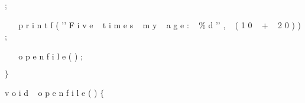 \documentclass[8, usernames, dvipsnames]{beamer}
\begin{document}
\begin{frame}
\textcolor{PineGreen}{;}

\textcolor{White}{\ }
\textcolor{White}{\ }
\textcolor{PineGreen}{p}
\textcolor{PineGreen}{r}
\textcolor{PineGreen}{i}
\textcolor{PineGreen}{n}
\textcolor{PineGreen}{t}
\textcolor{PineGreen}{f}
\textcolor{PineGreen}{(}
\textcolor{PineGreen}{'\hspace{0pt}'}
\textcolor{PineGreen}{F}
\textcolor{PineGreen}{i}
\textcolor{PineGreen}{v}
\textcolor{PineGreen}{e}
\textcolor{White}{\ }
\textcolor{PineGreen}{t}
\textcolor{PineGreen}{i}
\textcolor{PineGreen}{m}
\textcolor{PineGreen}{e}
\textcolor{PineGreen}{s}
\textcolor{White}{\ }
\textcolor{PineGreen}{m}
\textcolor{PineGreen}{y}
\textcolor{White}{\ }
\textcolor{PineGreen}{a}
\textcolor{PineGreen}{g}
\textcolor{PineGreen}{e}
\textcolor{PineGreen}{:}
\textcolor{White}{\ }
\textcolor{PineGreen}{\%}
\textcolor{PineGreen}{d}
\textcolor{PineGreen}{'\hspace{0pt}'}
\textcolor{PineGreen}{,}
\textcolor{White}{\ }
\textcolor{PineGreen}{(}
\textcolor{PineGreen}{1}
\textcolor{PineGreen}{0}
\textcolor{White}{\ }
\textcolor{PineGreen}{+}
\textcolor{White}{\ }
\textcolor{PineGreen}{2}
\textcolor{PineGreen}{0}
\textcolor{PineGreen}{)}
\textcolor{PineGreen}{)}
\textcolor{PineGreen}{;}

\textcolor{White}{\ }
\textcolor{White}{\ }
\textcolor{PineGreen}{o}
\textcolor{PineGreen}{p}
\textcolor{PineGreen}{e}
\textcolor{PineGreen}{n}
\textcolor{PineGreen}{\textunderscore}
\textcolor{PineGreen}{f}
\textcolor{PineGreen}{i}
\textcolor{PineGreen}{l}
\textcolor{PineGreen}{e}
\textcolor{PineGreen}{(}
\textcolor{PineGreen}{)}
\textcolor{PineGreen}{;}

\textcolor{PineGreen}{$\}$}


\textcolor{PineGreen}{v}
\textcolor{PineGreen}{o}
\textcolor{PineGreen}{i}
\textcolor{PineGreen}{d}
\textcolor{White}{\ }
\textcolor{PineGreen}{o}
\textcolor{PineGreen}{p}
\textcolor{PineGreen}{e}
\textcolor{PineGreen}{n}
\textcolor{PineGreen}{\textunderscore}
\textcolor{PineGreen}{f}
\textcolor{PineGreen}{i}
\textcolor{PineGreen}{l}
\textcolor{PineGreen}{e}
\textcolor{PineGreen}{(}
\textcolor{PineGreen}{)}
\textcolor{PineGreen}{$\{$}

\end{frame}
\end{document}

